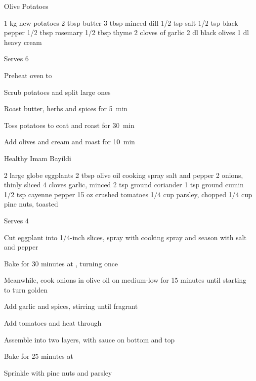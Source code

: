     
\begin{recipe}{Olive Potatoes}{\vegetarian{}}
\begin{ingredients}
1 kg new potatoes
2 tbsp butter
3 tbsp minced dill
1/2 tsp salt
1/2 tsp black pepper
1/2 tbsp rosemary
1/2 tbsp thyme
2 cloves of garlic
2 dl black olives
1 dl heavy cream
\end{ingredients}
\nextcolumn
Serves 6
\begin{steps}
    \item Preheat oven to 
    \item Scrub potatoes and split large ones
    \item Roast butter, herbs and spices for 5~min
    \item Toss potatoes to coat and roast for 30~min
    \item Add olives and cream and roast for 10~min
\end{steps}
\end{recipe}

\begin{denserecipe}{Healthy Imam Bayildi}{\vegetarian{}}
\begin{ingredients}
2 large globe eggplants
2 tbsp olive oil
cooking spray
salt and pepper
2 onions, thinly sliced
4 cloves garlic, minced
2 tsp ground coriander
1 tsp ground cumin
1/2 tsp cayenne pepper
15 oz crushed tomatoes
1/4 cup parsley, chopped
1/4 cup pine nuts, toasted
\end{ingredients}
\nextcolumn
Serves 4
\begin{steps}
    \item Cut eggplant into 1/4-inch slices, spray with cooking spray and season with salt and pepper
    \item Bake for 30 minutes at , turning once
    \item Meanwhile, cook onions in olive oil on medium-low for 15 minutes until starting to turn golden
    \item Add garlic and spices, stirring until fragrant
    \item Add tomatoes and heat through
    \item Assemble into two layers, with sauce on bottom and top
    \item Bake for 25 minutes at 
    \item Sprinkle with pine nuts and parsley
\end{steps}
\end{denserecipe}

